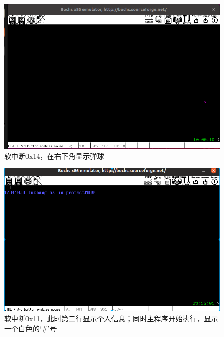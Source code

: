 \documentclass[a4paper,11pt,UTF8]{ctexart}
\newcommand{\bottomcaption}{%
\setlength{\abovecaptionskip}{6pt}%
\setlength{\belowcaptionskip}{6pt}%
\caption}
\begin{document}
	\begin{figure}[htbp]
		\centering
		\includegraphics[width=15cm]{expr_image/3.png}
		\bottomcaption{软中断0x14，在右下角显示弹球}
	\end{figure}
	
	\begin{figure}[htbp]
		\centering
		\includegraphics[width=15cm]{expr_image/DeepinScrot-5338.png}
		\bottomcaption{软中断0x11，此时第二行显示个人信息；同时主程序开始执行，显示一个白色的‘\#’号}
	\end{figure}
	
\end{document}
